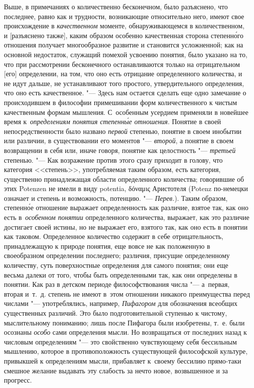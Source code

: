 Выше, в примечаниях о количественно бесконечном, было разъяснено, что
последнее, равно как и трудности, возникающие относительно него, имеют свое
происхождение в {\em качественном} моменте, обнаруживающемся в количественном,
и [разъяснено также], каким образом особенно качественная сторона
степенн\'{о}го отношения получает многообразное развитие и становится
усложненной; как на основной недостаток, служащий
помехой усвоению понятия, было указано на то, что при рассмотрении бесконечного
останавливаются только на отрицательном [его] определении, на том, что оно есть
отрицание определенного количества, и не идут дальше, не устанавливают того
простого, утвердительного определения, что оно есть качественное. "--- Здесь
нам остается сделать еще одно замечание о происходившем в философии
примешивании форм количественного к чистым качественным формам мышления.
С~особенным усердием применяли в новейшее время
к~{\em определениям понятия степенн\'{ы}е отношения}. Понятие в своей непосредственности было названо
{\em первой} степенью, понятие в своем инобытии или различии, в существовании
его моментов "--- {\em второй}, а понятие в своем возвращении в себя или, иначе
говоря, понятие как целостность "--- {\em третьей} степенью. "--- Как
возражение против этого сразу приходит в голову, что категория <<степень>>,
употребляемая таким образом, есть категория, существенно принадлежащая области
определенного количества; говорившие об этих Potenzen не имели в виду potentia,
\textgreek{δόναμις} Аристотеля (Potenz по-немецки означает и степень и
возможность, потенцию. "--- {\em Перев.}). Таким образом, степенн\'{о}е
отношение выражает определенность как различие, взятое так, как оно есть
в~{\em особенном понятии} определенного количества, выражает, как это различие
достигает своей истины, но не выражает его, взятого так, как оно есть в понятии
как таковом. Определенное количество содержит в себе отрицательность,
принадлежащую к природе понятия, еще вовсе не как положенную в своеобразном
определении последнего; различия, присущие определенному количеству, суть
поверхностные определения для самого понятия; они еще весьма далеки от того,
чтобы быть определенными так, как они определены в понятии. Как раз в детском
периоде философствования числа "--- а~первая, вторая и~т.~д. степень не имеют
в~этом отношении никакого преимущества перед числами "--- употреблялись,
например, {\em Пифагором} для обозначения всеобщих существенных различий. Это
было подготовительной ступенью к чистому, мыслительному пониманию; лишь после
Пифагора были изобретены, т.~е. были осознаны {\em особо} сами определения
мысли. Но возвращаться от последних назад к числовым определениям "--- это
свойственно чувствующему себя бессильным мышлению, которое в противоположность
существующей философской культуре, привыкшей к определениям мысли, прибавляет
к~своему бессилию прямо-таки смешное желание выдавать эту слабость за нечто
новое, возвышенное и за прогресс.

